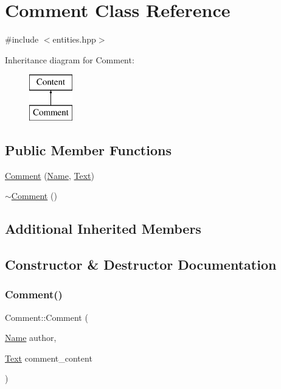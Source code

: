 \hypertarget{class_comment}{}\section{Comment Class Reference}
\label{class_comment}


{\ttfamily \#include $<$entities.\+hpp$>$}

Inheritance diagram for Comment\+:\begin{figure}[H]
\begin{center}
\leavevmode
\includegraphics[height=2.000000cm]{class_comment}
\end{center}
\end{figure}
\subsection*{Public Member Functions}
\begin{DoxyCompactItemize}
\item 
\hyperlink{class_comment_a681be12288dbce6ceb0a6a6ae0c17c9c}{Comment} (\hyperlink{class_name}{Name}, \hyperlink{class_text}{Text})
\item 
\hyperlink{class_comment_aea2c5f6168b3bfdc1dbb7bb99ac44454}{$\sim$\+Comment} ()
\end{DoxyCompactItemize}
\subsection*{Additional Inherited Members}


\subsection{Constructor \& Destructor Documentation}
\mbox{\label{class_comment_a681be12288dbce6ceb0a6a6ae0c17c9c}} 
\subsubsection{\texorpdfstring{Comment()}{Comment()}}
{\footnotesize\ttfamily Comment\+::\+Comment (\begin{DoxyParamCaption}\item[{\hyperlink{class_name}{Name}}]{author,  }\item[{\hyperlink{class_text}{Text}}]{comment\+\_\+content }\end{DoxyParamCaption})}

